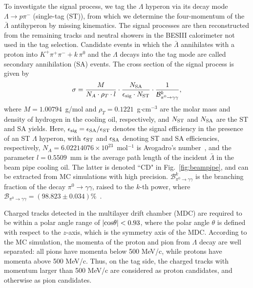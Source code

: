 \documentclass[prd,aps,reprint,noeprint,superscriptaddress,amsmath, amssymb]{revtex4-1}
\begin{document}
To investigate the signal process, we tag the $\Lambda$ hyperon via its decay mode $\Lambda \to p \pi^-$ (single-tag (ST)),
from which we determine the four-momentum of the $\bar{\Lambda}$ antihyperon by missing kinematics.
The signal processes are then reconstructed from the remaining tracks and neutral showers in the BESIII calorimeter not used in the tag selection.
Candidate events in which the $\bar{\Lambda}$ annihilates with a proton into $K^{+}\pi^{+}\pi^{-} + k\,\pi^{0}$
and the $\Lambda$ decays into the tag mode are called secondary annihilation (SA) events.
The cross section of the signal process is given by
\begin{equation}
\label{equ:crosssection}
    \sigma = \frac{M}{N_{A} \cdot \rho_{T} \cdot l} \cdot \frac{N_{\rm SA}}{\epsilon_{\rm sig} \cdot N_{\rm ST}} \cdot \frac{1}{{\mathcal B}^{k}_{\pi^0 \to \gamma\gamma}},
\end{equation}
where $M=1.00794$~g/mol and $\rho_T = 0.1221$~g$\cdot$cm$^{-3}$ are the molar mass and density of hydrogen in the cooling oil, respectively,
and ${N}_{\rm ST}$ and ${N}_{\rm SA}$ are the ST and SA yields.
Here, $\epsilon_{\rm sig} = \epsilon_{\rm SA}/\epsilon_{\rm ST}$ denotes the signal efficiency in the presence of
an ST $\Lambda$ hyperon, with $\epsilon_{\rm ST}$ and $\epsilon_{\rm SA}$ denoting ST and SA efficiencies, respectively,
$N_A = 6.02214076 \times 10^{23}$~mol$^{-1}$ is Avogadro’s number~\cite{Tiesinga:2021myr},
and the parameter $l = 0.5509$~mm is the average path length of the incident $\bar{\Lambda}$ in the beam pipe cooling oil.
The latter is denoted ``CD" in Fig.~\ref{fig:beampipe},
and can be extracted from MC simulations with high precision.
$\mathcal{B}^k_{\pi^0 \to \gamma \gamma}$ is the branching fraction of the decay $\pi^0 \to \gamma \gamma$, raised to the $k$-th power,
where $\mathcal{B}_{\pi^0 \to \gamma \gamma} = (98.823\pm0.034)\%$~\cite{PDG}.

Charged tracks detected in the multilayer drift chamber (MDC) are required to be within a polar angle
range of $|\rm{cos\theta}|<0.93$, where the polar angle $\theta$ is defined with respect to the $z$-axis,
which is the symmetry axis of the MDC.
According to the MC simulation, the momenta of the proton and pion from $\Lambda$ decay are well separated:
all pions have momenta below 500 MeV/c, while protons have momenta above 500 MeV/c.
Thus, on the tag side, the charged tracks with momentum larger than 500 MeV/c are considered as proton candidates, and
otherwise as pion candidates.
\end{document}
